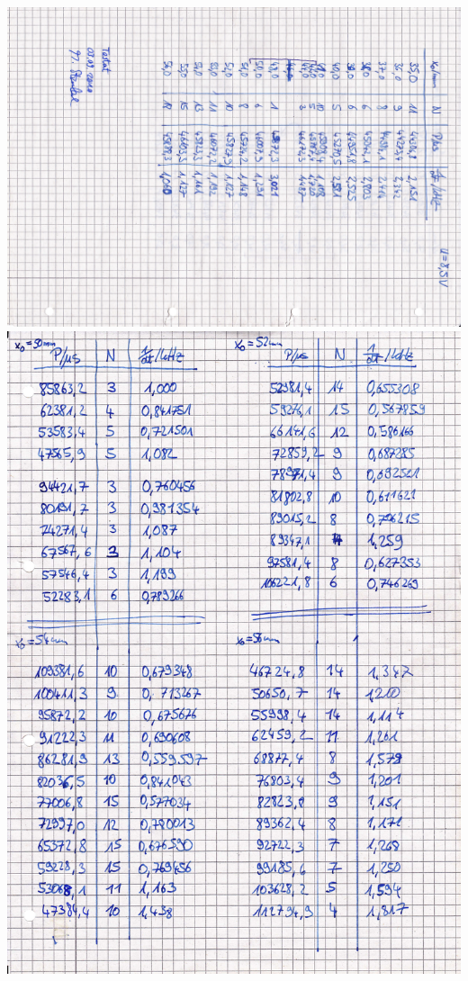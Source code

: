 \begin{appendix}
\centering \includegraphics[width=\textwidth]{Bilder/Protokoll/04.pdf}
\centering \includegraphics[width=\textwidth]{Bilder/Protokoll/05.pdf}





\end{appendix}